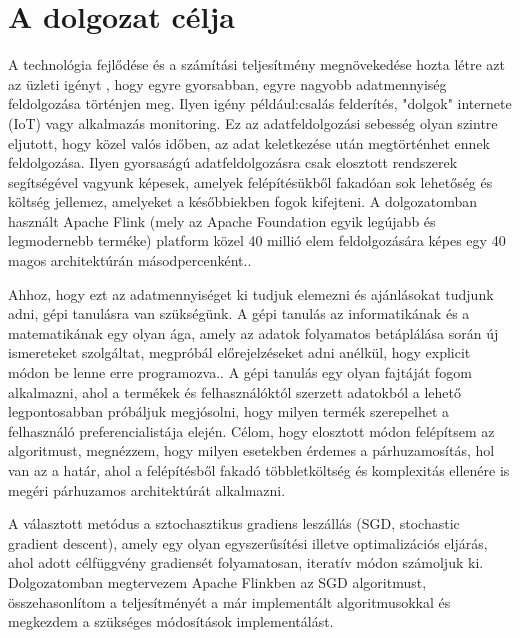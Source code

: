 \documentclass[a4paper,12pt]{article}
\begin{document}
\section{A dolgozat célja}
A technológia fejlődése és a számítási teljesítmény megnövekedése hozta létre azt az üzleti igényt \cite{rta}, hogy egyre gyorsabban, egyre nagyobb adatmennyiség feldolgozása történjen meg. Ilyen igény például:csalás felderítés\cite{fraud}, "dolgok" internete (IoT) \cite{iot} vagy alkalmazás monitoring\cite{ganalitycs}. Ez az adatfeldolgozási sebesség olyan szintre eljutott, hogy közel valós időben, az adat keletkezése után megtörténhet ennek feldolgozása. Ilyen gyorsaságú adatfeldolgozásra csak elosztott rendszerek segítségével vagyunk képesek, \cite{ucl} amelyek felépítésükből fakadóan sok lehetőség és költség jellemez, amelyeket a későbbiekben fogok kifejteni. A dolgozatomban használt Apache Flink (mely az Apache Foundation egyik legújabb és legmodernebb terméke) platform közel 40 millió elem feldolgozására képes egy 40 magos architektúrán másodpercenként.\cite{flinkintro}.\newline

Ahhoz, hogy ezt az adatmennyiséget ki tudjuk elemezni és ajánlásokat tudjunk adni, gépi tanulásra van szükségünk. A gépi tanulás az informatikának és a matematikának egy olyan ága, amely az adatok folyamatos betáplálása során új ismereteket szolgáltat, megpróbál előrejelzéseket adni anélkül, hogy explicit módon be lenne erre programozva.\cite{ml}. A gépi tanulás egy olyan fajtáját fogom alkalmazni, ahol a termékek és felhasználóktól szerzett adatokból a lehető legpontosabban próbáljuk megjósolni, hogy milyen termék szerepelhet a felhasználó preferencialistája elején. Célom, hogy elosztott módon felépítsem az algoritmust, megnézzem, hogy milyen esetekben érdemes a párhuzamosítás, hol van az a határ, ahol a felépítésből fakadó többletköltség és komplexitás ellenére is megéri párhuzamos architektúrát alkalmazni. 
\newline

A választott metódus a sztochasztikus gradiens leszállás (SGD, stochastic gradient descent)\cite{sgd}, amely egy olyan egyszerűsítési illetve optimalizációs eljárás, ahol adott célfüggvény gradiensét folyamatosan, iteratív módon számoljuk ki. Dolgozatomban megtervezem Apache Flinkben az SGD algoritmust, összehasonlítom a teljesítményét a már implementált algoritmusokkal és megkezdem a szükséges módosítások implementálást.
\end{document}
